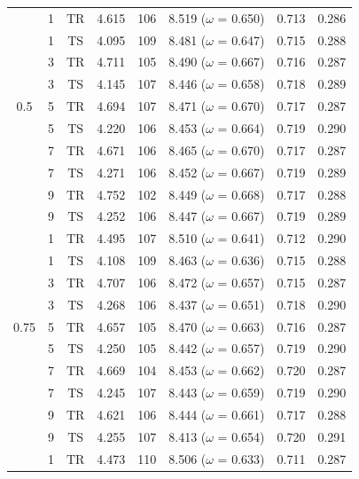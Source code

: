 \documentclass[doc,natbib,floatsintext]{apa7}
\begin{document}
\begin{appendices}
\begin{table}[!ht]
\begin{center}
{\begin{tabular}{c c c c c c c c}
\toprule
& 1 & $\text{TR}$ & 4.615 & 106 &  8.519 ($\omega$ = 0.650) & 0.713 & 0.286\\
& 1 & $\text{TS}$ & 4.095 & 109 &  8.481 ($\omega$ = 0.647) & 0.715 & 0.288\\
& 3 & $\text{TR}$ & 4.711 & 105 &  8.490 ($\omega$ = 0.667) & 0.716 & 0.287\\
& 3 & $\text{TS}$ & 4.145 & 107 &  8.446 ($\omega$ = 0.658) & 0.718 & 0.289\\
0.5  & 5 & $\text{TR}$ & 4.694 & 107 &  8.471 ($\omega$ = 0.670) & 0.717 & 0.287\\
& 5 & $\text{TS}$ & 4.220 & 106 &  8.453 ($\omega$ = 0.664) & 0.719 & 0.290\\
& 7 & $\text{TR}$ & 4.671 & 106 &  8.465 ($\omega$ = 0.670) & 0.717 & 0.287\\
& 7 & $\text{TS}$ & 4.271 & 106 &  8.452 ($\omega$ = 0.667) & 0.719 & 0.289\\
& 9 & $\text{TR}$ & 4.752 & 102 &  8.449 ($\omega$ = 0.668) & 0.717 & 0.288\\
& 9 & $\text{TS}$ & 4.252 & 106 &  8.447 ($\omega$ = 0.667) & 0.719 & 0.289\\
\midrule
& 1 & $\text{TR}$ & 4.495 & 107 & 8.510 ($\omega$ = 0.641) &  0.712 & 0.290\\
& 1 & $\text{TS}$ & 4.108 & 109 & 8.463 ($\omega$ = 0.636) & 0.715 & 0.288\\
& 3 & $\text{TR}$ & 4.707 & 106 & 8.472 ($\omega$ = 0.657) &  0.715 & 0.287\\
& 3 & $\text{TS}$ & 4.268 & 106 & 8.437 ($\omega$ = 0.651) &  0.718 & 0.290\\
0.75 & 5 & $\text{TR}$ & 4.657 & 105 & 8.470 ($\omega$ = 0.663) & 0.716 & 0.287\\
& 5 & $\text{TS}$ & 4.250 & 105 & 8.442 ($\omega$ = 0.657) &  0.719 & 0.290\\
& 7 & $\text{TR}$ & 4.669 & 104 & 8.453 ($\omega$ = 0.662) &  0.720 & 0.287\\
& 7 & $\text{TS}$ & 4.245 & 107 & 8.443 ($\omega$ = 0.659) &  0.719 & 0.290\\
& 9 & $\text{TR}$ & 4.621 & 106 & 8.444 ($\omega$ = 0.661) &  0.717 & 0.288\\
& 9 & $\text{TS}$ & 4.255 & 107 & 8.413 ($\omega$ = 0.654) &  0.720 & 0.291\\
\midrule
& 1 & $\text{TR}$ &4.473 & 110 & 8.506 ($\omega$ = 0.633) & 0.711 & 0.287\\

\end{tabular}}
\end{center}
\end{table}
\end{appendices}
\end{document}
